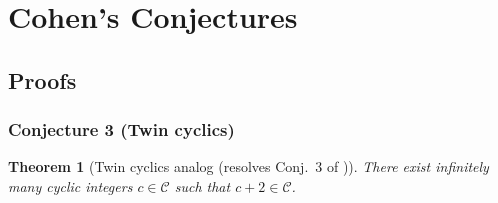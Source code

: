 \documentclass[12pt]{article}
\newtheorem{theorem}{Theorem}
\theoremstyle{remark}
\begin{document}
\section{Cohen's Conjectures}

\subsection{Proofs}

\subsubsection{Conjecture 3 (Twin cyclics)}
\begin{theorem}[Twin cyclics analog (resolves Conj.~3 of \cite{Cohen2025})]\label{thm:twin_cyclics}
There exist infinitely many cyclic integers \(c\in\mathcal{C}\) such that \(c+2\in\mathcal{C}\).
\end{theorem}
\end{document}
